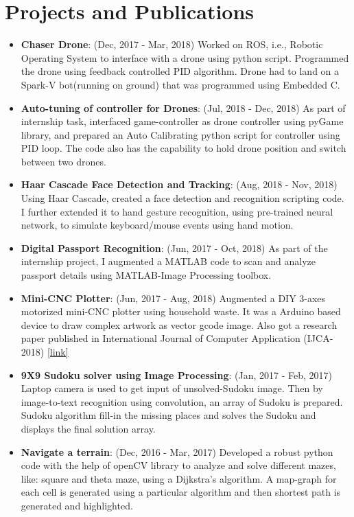 \documentclass[letterpaper,11pt]{article}
\newcommand{\resumeItem}[2]{
  \item\small{
    \textbf{#1}{: #2 \vspace{-2pt}}
  }
}
\newcommand{\resumeSubHeadingListStart}{\begin{itemize}[leftmargin=*]}
\newcommand{\resumeSubHeadingListEnd}{\end{itemize}}
\begin{document}
\section{Projects and Publications}
  \resumeSubHeadingListStart
        \resumeItem{Chaser Drone}{(Dec, 2017 - Mar, 2018) Worked on ROS, i.e., Robotic Operating System to interface with a drone using python script. Programmed the drone using feedback controlled PID algorithm. Drone had to land on a Spark-V bot(running on ground) that was programmed using Embedded C.}
        \resumeItem{Auto-tuning of controller for Drones}{(Jul, 2018 - Dec, 2018) As part of internship task, interfaced game-controller as drone controller using pyGame library, and prepared an Auto Calibrating python script for controller using PID loop. The code also has the capability to hold drone position and switch between two drones.}
        \resumeItem{Haar Cascade Face Detection and Tracking}{(Aug, 2018 - Nov, 2018) Using Haar Cascade,  created a face detection and recognition scripting code. I further extended it to hand gesture recognition, using pre-trained neural network, to simulate keyboard/mouse events using hand motion.}
        \resumeItem{Digital Passport Recognition}{(Jun, 2017 - Oct, 2018) As part of the internship project, I augmented a MATLAB code to scan and analyze passport details using MATLAB-Image Processing toolbox.}
        \resumeItem{Mini-CNC Plotter}{(Jun, 2017 - Aug, 2018) Augmented a DIY 3-axes motorized mini-CNC plotter using household waste. It was a Arduino based device to draw complex artwork as vector gcode image. Also got a research paper published in International Journal of Computer Application (IJCA-2018) \href{https://www.ijcaonline.org/archives/volume182/number12/29871-2018917694}{[link]}}
        \resumeItem{9X9 Sudoku solver using Image Processing}{(Jan, 2017 - Feb, 2017) Laptop camera is used to get input of unsolved-Sudoku image. Then by image-to-text recognition using convolution, an array of Sudoku is prepared. Sudoku algorithm fill-in the missing places and solves the Sudoku and displays the final solution array.}
        \resumeItem{Navigate a terrain}{(Dec, 2016 - Mar, 2017) Developed a robust python code with the help of openCV library to analyze and solve different mazes, like: square and theta maze, using a Dijkstra's algorithm. A map-graph for each cell is generated using a particular algorithm and then shortest path is generated and highlighted.}
  \resumeSubHeadingListEnd

\end{document}
